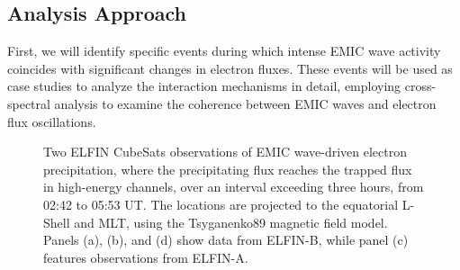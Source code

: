 \documentclass[
  letterpaper,
  DIV=11,
  numbers=noendperiod]{scrartcl}
\begin{document}
\subsection{Analysis Approach}\label{analysis-approach}

First, we will identify specific events during which intense EMIC wave activity coincides with significant changes in electron fluxes. These events will be used as case studies to analyze the interaction mechanisms in detail, employing cross-spectral analysis to examine the coherence between EMIC waves and electron flux oscillations.

\begin{figure}


\caption{\label{fig-elfin}Two ELFIN CubeSats observations of EMIC wave-driven electron precipitation, where the precipitating flux reaches the trapped flux in high-energy channels, over an interval exceeding three hours, from 02:42 to 05:53 UT. The locations are projected to the equatorial L-Shell and MLT, using the Tsyganenko89 magnetic field model. Panels (a), (b), and (d) show data from ELFIN-B, while panel (c) features observations from ELFIN-A.}

\end{figure}%
\end{document}
